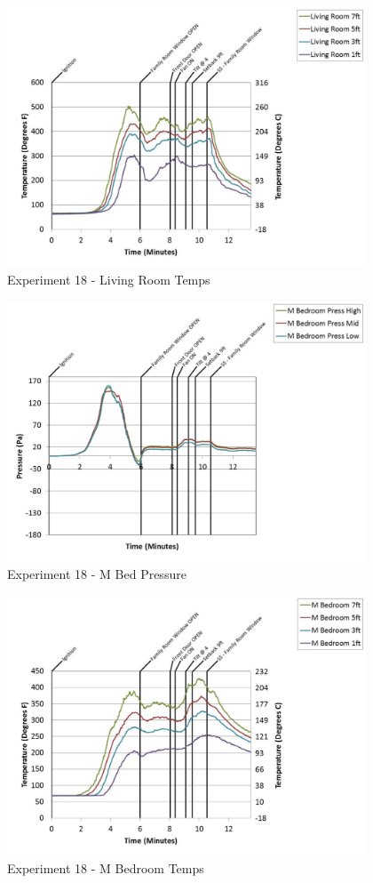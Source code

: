 \documentclass{article}
\begin{document}
\begin{appendices}
	\begin{figure}[h!]
		\centering
		\includegraphics[height=3.05in]{0_Images/Results_Charts/Exp_18_Charts/LivingRoomTemps.pdf}
		\caption{Experiment 18 - Living Room Temps}
	\end{figure}
 
	\clearpage

	\begin{figure}[h!]
		\centering
		\includegraphics[height=3.05in]{0_Images/Results_Charts/Exp_18_Charts/MBedPressure.pdf}
		\caption{Experiment 18 - M Bed Pressure}
	\end{figure}
 

	\begin{figure}[h!]
		\centering
		\includegraphics[height=3.05in]{0_Images/Results_Charts/Exp_18_Charts/MBedroomTemps.pdf}
		\caption{Experiment 18 - M Bedroom Temps}
	\end{figure}
 

\end{appendices}
\end{document}
